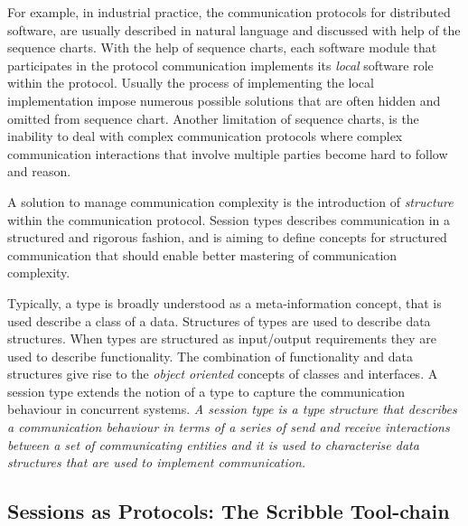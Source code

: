 For example, in industrial practice, the communication protocols for
distributed software, are usually described in natural language and
discussed with help of the sequence charts.
With the help of sequence charts,
each software module that participates in the
protocol communication implements
its \emph{local} software role within the protocol.
Usually the process of implementing the local implementation
impose numerous possible solutions that are often hidden and
omitted from sequence chart.
Another limitation of sequence charts, is the inability to deal with complex
communication protocols where complex communication interactions
that involve multiple parties become hard to follow and reason.

A solution to manage communication complexity
is the introduction of \emph{structure} within the communication protocol.
Session types describes communication in a structured and rigorous fashion,
and is aiming to define concepts for structured communication
that should enable better mastering of communication complexity.


Typically, a type is broadly understood
as a meta-information concept, that is used describe a class of a data.
Structures of types are used to describe data structures.
When types are structured as input/output requirements they
are used to describe functionality.
The combination of functionality and data structures give rise
to the \emph{object oriented} concepts of classes and interfaces.%
%
A session type extends %
the notion of a type to capture the communication behaviour in concurrent systems.
{\em A session type is a type structure that describes a communication
	behaviour in terms of a series of send and receive %
	interactions between a set of communicating entities and it is used
	to characterise data structures that are used to implement communication.}

\subsection{Sessions as Protocols: The Scribble Tool-chain}
\label{sec:sessions_scribble}

